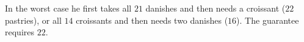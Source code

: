 In the worst case he first takes all $21$ danishes and then needs a croissant ($22$ pastries), or all $14$ croissants and then needs two danishes ($16$). The guarantee requires $\boxed{22}$.
